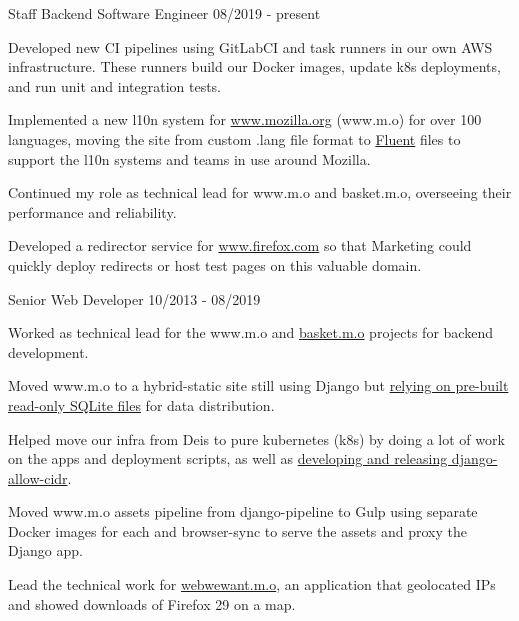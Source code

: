 \documentclass[11pt]{article} %
\begin{document}
\begin{description}
\squish
{}
           {Staff Backend Software Engineer}
           {08/2019 - present}

\item Developed new CI pipelines using GitLabCI and task runners in our own AWS infrastructure.
These runners build our Docker images, update k8s deployments, and run unit and integration tests.

\item Implemented a new l10n system for \href{https://github.com/mozilla/bedrock/}{www.mozilla.org} (www.m.o)
for over 100 languages, moving the site from custom .lang file format to \href{https://www.projectfluent.org/}{Fluent} files to support
the l10n systems and teams in use around Mozilla.

\item Continued my role as technical lead for www.m.o and basket.m.o, overseeing their performance and reliability.

\item Developed a redirector service for \href{https://github.com/mozmeao/www.firefox.com/}{www.firefox.com} so that Marketing could quickly deploy redirects or host
test pages on this valuable domain.

           {Senior Web Developer}
           {10/2013 - 08/2019}

\item Worked as technical lead for the www.m.o and \href{https://github.com/mozmeao/basket/}{basket.m.o} projects for backend development.

\item Moved www.m.o to a hybrid-static site still using Django but
\href{https://mozilla.github.io/meao/2018/03/28/bedrock-the-sqlitening/}{relying on pre-built read-only SQLite files} for
data distribution.

\item Helped move our infra from Deis to pure kubernetes (k8s) by doing a lot of work on the apps and deployment scripts,
as well as \href{https://mozilla.github.io/meao/2018/02/27/django-k8s-elb-health-checks/}{developing and releasing django-allow-cidr}.

\item Moved www.m.o assets pipeline from django-pipeline to Gulp using separate Docker images for each and browser-sync to serve the assets
and proxy the Django app.

\item Lead the technical work for \href{https://blog.mozilla.org/webdev/2014/04/28/celebrating-the-web-we-want/}{webwewant.m.o},
an application that geolocated IPs and showed downloads of Firefox 29 on a map.


\end{description}
\end{document}
